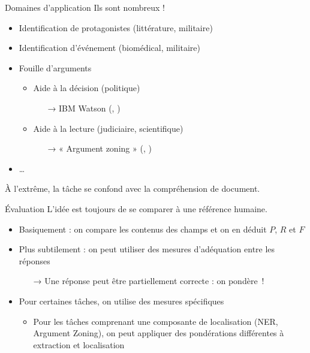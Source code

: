 \documentclass[hyperref={unicode}, xcolor={svgnames}, french]{beamer}
\begin{document}
\begin{frame}{Domaines d'application}
    Ils sont nombreux !
    \begin{itemize}
        \item Identification de protagonistes (littérature, militaire)
        \item Identification d'événement (biomédical, militaire)
        \item Fouille d'arguments
            \begin{itemize}
                \item Aide à la décision (politique)
                    \begin{itemize}
                        \item[→] IBM Watson (\textcite{slonim2014claims}, )
                    \end{itemize}
                \item Aide à la lecture (judiciaire, scientifique)
                    \begin{itemize}
                        \item[→] « Argument zoning » (\textcite{teufel2009argument}, )
                    \end{itemize}
            \end{itemize}
        \item …
    \end{itemize}
    À l'extrême, la tâche se confond avec la compréhension de document.
\end{frame}

\begin{frame}{Évaluation}
    L'idée est toujours de se comparer à une référence humaine.
    \begin{itemize}
        \item Basiquement : on compare les contenus des champs et on en déduit $P$, $R$ et $F$
        \item Plus subtilement : on peut utiliser des mesures d'adéquation entre les réponses
            \begin{itemize}
                \item[→] Une réponse peut être partiellement correcte : on pondère~!
            \end{itemize}
        \item Pour certaines tâches, on utilise des mesures spécifiques
            \begin{itemize}
                \item Pour les tâches comprenant une composante de localisation (NER, Argument Zoning), on peut appliquer des pondérations différentes à extraction et localisation
            \end{itemize}
    \end{itemize}
\end{frame}
\end{document}
